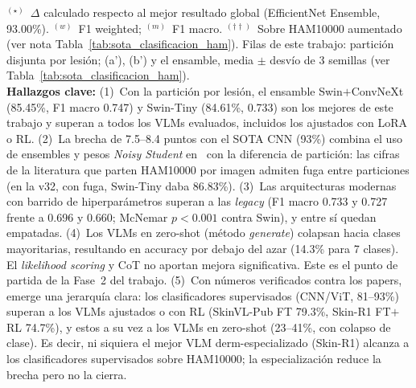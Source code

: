 \begin{table}[htbp]
{\begin{tabular}{@{}llrrrl@{}}
\bottomrule
\end{tabular}%
}
\vspace{4pt}
\begin{minipage}{\textwidth}
  \footnotesize
  $^{(\star)}$~$\Delta$ calculado respecto al mejor resultado global
  (EfficientNet Ensemble, 93.00\%).
  $^{(w)}$~F1 weighted; $^{(m)}$~F1 macro.
  $^{(\dagger\dagger)}$~Sobre HAM10000 aumentado (ver nota Tabla~\ref{tab:sota_clasificacion_ham}).
  Filas de este trabajo: partición disjunta por lesión; (a'), (b') y el ensamble, media $\pm$ desvío de
  3 semillas (ver Tabla~\ref{tab:sota_clasificacion_ham}).\\[4pt]
  \textbf{Hallazgos clave:}
  (1)~Con la partición por lesión, el ensamble Swin$+$ConvNeXt (85.45\%, F1 macro 0.747) y Swin-Tiny
  (84.61\%, 0.733) son los mejores de este trabajo y superan a todos los VLMs evaluados, incluidos los
  ajustados con LoRA o RL.
  (2)~La brecha de 7.5--8.4 puntos con el SOTA CNN (93\%) combina el uso de ensembles y pesos
  \textit{Noisy Student} en~\cite{SkinHealthMate2024} con la diferencia de partición: las cifras de la
  literatura que parten HAM10000 por imagen admiten fuga entre particiones (en la v32, con fuga, Swin-Tiny
  daba 86.83\%).
  (3)~Las arquitecturas modernas con barrido de hiperparámetros superan a las \textit{legacy} (F1 macro
  0.733 y 0.727 frente a 0.696 y 0.660; McNemar $p<0.001$ contra Swin), y entre sí quedan empatadas.
  (4)~Los VLMs en zero-shot (método \textit{generate}) colapsan hacia clases
  mayoritarias, resultando en accuracy por debajo del azar (14.3\% para 7 clases).
  El \textit{likelihood scoring} y CoT no aportan mejora significativa.
  Este es el punto de partida de la Fase~2 del trabajo.
  (5)~Con números verificados contra los papers, emerge una jerarquía clara: los
  clasificadores supervisados (CNN/ViT, 81--93\%) superan a los VLMs ajustados o con RL
  (SkinVL-Pub FT 79.3\%, Skin-R1 FT$+$RL 74.7\%), y estos a su vez a los VLMs en zero-shot
  (23--41\%, con colapso de clase). Es decir, ni siquiera el mejor VLM derm-especializado
  (Skin-R1) alcanza a los clasificadores supervisados sobre HAM10000; la especialización
  reduce la brecha pero no la cierra.
\end{minipage}
\end{table}
